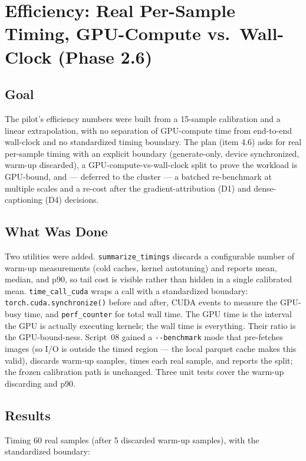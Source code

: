 \chapter{Efficiency: Real Per-Sample Timing, GPU-Compute vs.\ Wall-Clock (Phase 2.6)}
\label{chap:p2-6}

\section{Goal}

The pilot's efficiency numbers were built from a 15-sample calibration and a linear extrapolation, with
no separation of GPU-compute time from end-to-end wall-clock and no standardized timing boundary. The
plan (item 4.6) asks for real per-sample timing with an explicit boundary (generate-only, device
synchronized, warm-up discarded), a GPU-compute-vs-wall-clock split to prove the workload is GPU-bound,
and --- deferred to the cluster --- a batched re-benchmark at multiple scales and a re-cost after the
gradient-attribution (D1) and dense-captioning (D4) decisions.

\section{What Was Done}

Two utilities were added. \texttt{summarize\_timings} discards a configurable number of warm-up
measurements (cold caches, kernel autotuning) and reports mean, median, and p90, so tail cost is visible
rather than hidden in a single calibrated mean. \texttt{time\_call\_cuda} wraps a call with a
standardized boundary: \texttt{torch.cuda.synchronize()} before and after, CUDA events to measure the
GPU-busy time, and \texttt{perf\_counter} for total wall time. The GPU time is the interval the GPU is
actually executing kernels; the wall time is everything. Their ratio is the GPU-bound-ness. Script~08
gained a \texttt{-{}-benchmark} mode that pre-fetches images (so I/O is outside the timed region ---
the local parquet cache makes this valid), discards warm-up samples, times each real sample, and reports
the split; the frozen calibration path is unchanged. Three unit tests cover the warm-up discarding and
p90.

\section{Results}

Timing 60 real samples (after 5 discarded warm-up samples), with the standardized boundary:

